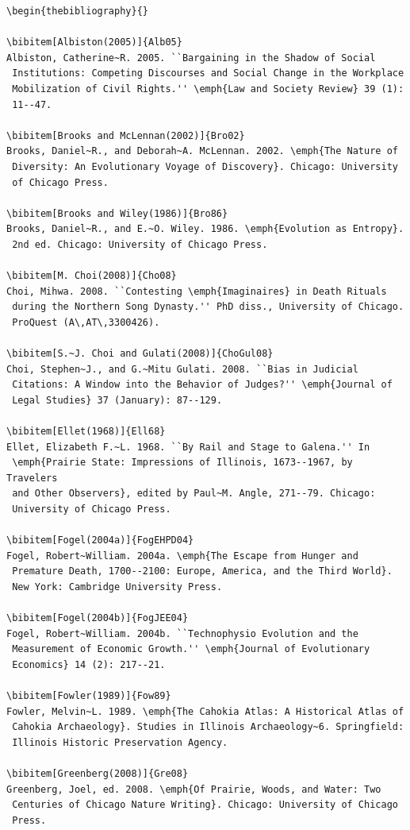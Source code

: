 \documentclass[]{interact}
\theoremstyle{plain}%
\theoremstyle{definition}
\theoremstyle{remark}
\begin{document}
\begin{verbatim}
\begin{thebibliography}{}

\bibitem[Albiston(2005)]{Alb05}
Albiston, Catherine~R. 2005. ``Bargaining in the Shadow of Social
 Institutions: Competing Discourses and Social Change in the Workplace
 Mobilization of Civil Rights.'' \emph{Law and Society Review} 39 (1):
 11--47.

\bibitem[Brooks and McLennan(2002)]{Bro02}
Brooks, Daniel~R., and Deborah~A. McLennan. 2002. \emph{The Nature of
 Diversity: An Evolutionary Voyage of Discovery}. Chicago: University
 of Chicago Press.

\bibitem[Brooks and Wiley(1986)]{Bro86}
Brooks, Daniel~R., and E.~O. Wiley. 1986. \emph{Evolution as Entropy}.
 2nd ed. Chicago: University of Chicago Press.

\bibitem[M. Choi(2008)]{Cho08}
Choi, Mihwa. 2008. ``Contesting \emph{Imaginaires} in Death Rituals
 during the Northern Song Dynasty.'' PhD diss., University of Chicago.
 ProQuest (A\,AT\,3300426).

\bibitem[S.~J. Choi and Gulati(2008)]{ChoGul08}
Choi, Stephen~J., and G.~Mitu Gulati. 2008. ``Bias in Judicial
 Citations: A Window into the Behavior of Judges?'' \emph{Journal of
 Legal Studies} 37 (January): 87--129.

\bibitem[Ellet(1968)]{Ell68}
Ellet, Elizabeth F.~L. 1968. ``By Rail and Stage to Galena.'' In
 \emph{Prairie State: Impressions of Illinois, 1673--1967, by Travelers
 and Other Observers}, edited by Paul~M. Angle, 271--79. Chicago:
 University of Chicago Press.

\bibitem[Fogel(2004a)]{FogEHPD04}
Fogel, Robert~William. 2004a. \emph{The Escape from Hunger and
 Premature Death, 1700--2100: Europe, America, and the Third World}.
 New York: Cambridge University Press.

\bibitem[Fogel(2004b)]{FogJEE04}
Fogel, Robert~William. 2004b. ``Technophysio Evolution and the
 Measurement of Economic Growth.'' \emph{Journal of Evolutionary
 Economics} 14 (2): 217--21.

\bibitem[Fowler(1989)]{Fow89}
Fowler, Melvin~L. 1989. \emph{The Cahokia Atlas: A Historical Atlas of
 Cahokia Archaeology}. Studies in Illinois Archaeology~6. Springfield:
 Illinois Historic Preservation Agency.

\bibitem[Greenberg(2008)]{Gre08}
Greenberg, Joel, ed. 2008. \emph{Of Prairie, Woods, and Water: Two
 Centuries of Chicago Nature Writing}. Chicago: University of Chicago
 Press.


\end{verbatim}
\end{document}

